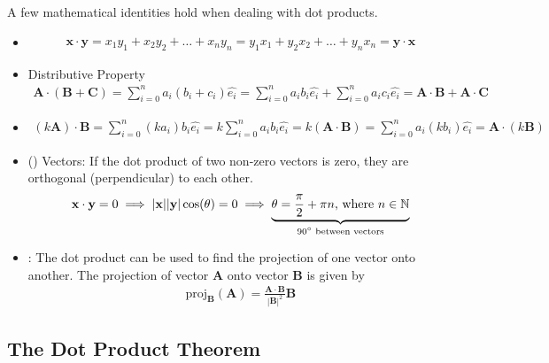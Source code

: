A few mathematical identities hold when dealing with dot products.

\begin{itemize}
	\item {}
	\begin{align}
		\mathbf{x}\cdot\mathbf{y} = x_1y_1 + x_2y_2 + \hdots + x_ny_n = y_1x_1 + y_2x_2 + \hdots + y_nx_n = \mathbf{y}\cdot\mathbf{x}
	\end{align}
	\item Distributive Property
	\begin{align}
		 \mathbf{A} \cdot (\mathbf{B} + \mathbf{C}) = \sum_{i=0}^{n}a_i(b_i+c_i)\hat{e_i} = \sum_{i=0}^{n}a_ib_i\hat{e_i} + \sum_{i=0}^{n}a_ic_i\hat{e_i} = \mathbf{A} \cdot \mathbf{B} + \mathbf{A} \cdot \mathbf{C}
	\end{align}
	\item {}
	\begin{align}
		(k\mathbf{A}) \cdot \mathbf{B} = \sum_{i=0}^{n}(ka_i)b_i\hat{e_i} = k\sum_{i=0}^{n}a_ib_i\hat{e_i} = k(\mathbf{A} \cdot \mathbf{B}) = \sum_{i=0}^{n}a_i(kb_i)\hat{e_i}= \mathbf{A} \cdot (k\mathbf{B})
	\end{align}
	\item {} () Vectors: If the dot product of two non-zero vectors is zero, they are orthogonal (perpendicular) to each other.
	\begin{align}
		\mathbf{x}\cdot\mathbf{y} = 0 \implies  |\mathbf{x}||\mathbf{y}|\cos(\theta) = 0 \implies \underbrace{\theta = \frac{\pi}{2}+\pi n\text{, where } n\in {\mathbb N}}_{\text{$90^\circ$ between vectors}}
	\end{align}
	\item {}: The dot product can be used to find the projection of one vector onto another. The projection of vector $\mathbf{A}$ onto vector $\mathbf{B}$ is given by
	\begin{align}
		\text{proj}_{\mathbf{B}}(\mathbf{A}) = \frac{\mathbf{A} \cdot \mathbf{B}}{|\mathbf{B}|^2} \mathbf{B}
	\end{align}
\end{itemize}

\subsection{The Dot Product Theorem}

